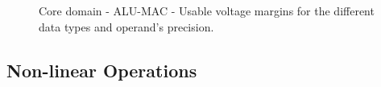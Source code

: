 
\begin{figure}[!htb]
    \centering
    \begin{subfigmatrix}{2}
      \label{fig:MAC_guardband}
    \end{subfigmatrix}
    \caption{Core domain - ALU-MAC - Usable voltage margins for the different data types and operand's precision.}
\end{figure}



\subsection{Non-linear Operations}

